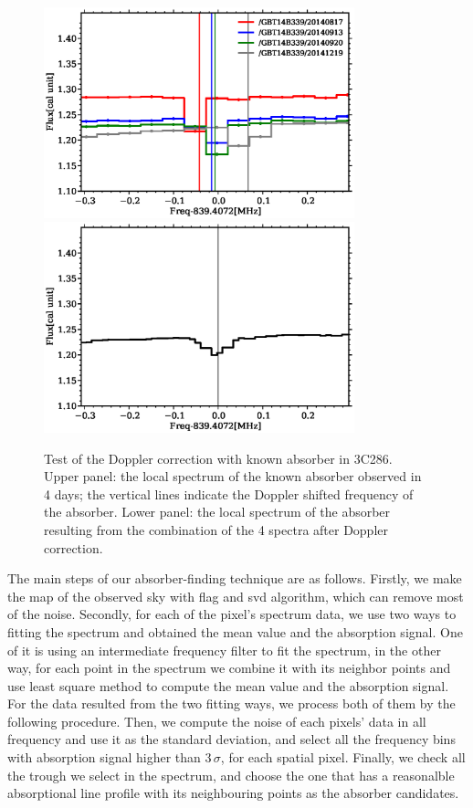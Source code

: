 \documentclass[prl,twocolumn,floatfix,superscriptaddress,nofootinbib,aps]{revtex4}
\begin{document}
\begin{figure}[h!]
     \centering
     \includegraphics[width=9cm]{doppler_check01.eps}
     \includegraphics[width=9cm]{doppler_check02.eps}
     \caption{Test of the Doppler correction with known absorber in 3C286. Upper panel: the local spectrum of the known absorber observed in 4 days; the vertical lines indicate the Doppler shifted frequency of the absorber. Lower panel: the local spectrum of the absorber resulting from the combination of the 4 spectra after Doppler correction.}
     \label{doppler correction}
\end{figure}

The main steps of our absorber-finding technique are as follows. 
Firstly, we make the map of the observed sky with flag and svd algorithm, which can remove most of the noise. Secondly, for each of the pixel's spectrum data, we use two ways to fitting the spectrum and obtained the mean value and the absorption signal. One of it is using an intermediate frequency filter to fit the spectrum, in the other way, for each point in the spectrum we combine it with its neighbor points and use least square method to compute the mean value and the absorption signal. For the data resulted from the two fitting ways, we process both of them by the following procedure. Then, we compute the noise of each pixels' data in all frequency and use it as the standard deviation, and select all the frequency bins with absorption signal higher than $3\, \sigma$, for each spatial pixel. Finally, we check all the trough we select in the spectrum, and choose the one that has a reasonalble absorptional line profile with its neighbouring points as the absorber candidates.
\end{document}
